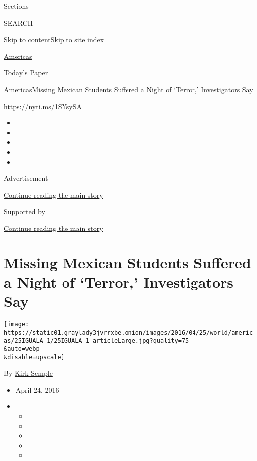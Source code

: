 Sections

SEARCH

\protect\hyperlink{site-content}{Skip to
content}\protect\hyperlink{site-index}{Skip to site index}

\href{https://www.nytimes3xbfgragh.onion/section/world/americas}{Americas}

\href{https://myaccount.nytimes3xbfgragh.onion/auth/login?response_type=cookie\&client_id=vi}{}

\href{https://www.nytimes3xbfgragh.onion/section/todayspaper}{Today's
Paper}

\href{/section/world/americas}{Americas}\textbar{}Missing Mexican
Students Suffered a Night of `Terror,' Investigators Say

\url{https://nyti.ms/1SYsySA}

\begin{itemize}
\item
\item
\item
\item
\item
\end{itemize}

Advertisement

\protect\hyperlink{after-top}{Continue reading the main story}

Supported by

\protect\hyperlink{after-sponsor}{Continue reading the main story}

\hypertarget{missing-mexican-students-suffered-a-night-of-terror-investigators-say}{%
\section{Missing Mexican Students Suffered a Night of `Terror,'
Investigators
Say}\label{missing-mexican-students-suffered-a-night-of-terror-investigators-say}}

\texttt{[image: https://static01.graylady3jvrrxbe.onion/images/2016/04/25/world/americas/25IGUALA-1/25IGUALA-1-articleLarge.jpg?quality=75\\\&auto=webp\\\&disable=upscale]}

By \href{http://www.nytimes3xbfgragh.onion/by/kirk-semple}{Kirk Semple}

\begin{itemize}
\item
  April 24, 2016
\item
  \begin{itemize}
  \item
  \item
  \item
  \item
  \item
  \end{itemize}
\end{itemize}

